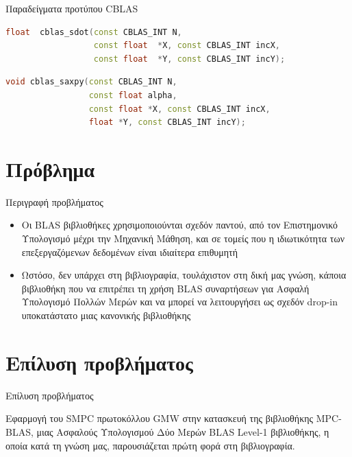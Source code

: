 \documentclass[10pt]{beamer}
\begin{document}
    \begin{frame}[fragile]{Παραδείγματα προτύπου CBLAS}

        \begin{block}{}
            \begin{lstlisting}[firstnumber=1, xleftmargin=10pt, language=C++]
float  cblas_sdot(const CBLAS_INT N,
                  const float  *X, const CBLAS_INT incX,
                  const float  *Y, const CBLAS_INT incY);
            \end{lstlisting}
        \end{block}
        \begin{block}{}
            \begin{lstlisting}[firstnumber=1, xleftmargin=10pt, language=C++]
void cblas_saxpy(const CBLAS_INT N,
                 const float alpha,
                 const float *X, const CBLAS_INT incX,
                 float *Y, const CBLAS_INT incY);
            \end{lstlisting}
        \end{block}

    \end{frame}

    \section{Πρόβλημα}
    \begin{frame}[c]{Περιγραφή προβλήματος}
        \centering
        \begin{block}{}
            \begin{itemize}
                \item Οι BLAS βιβλιοθήκες χρησιμοποιούνται σχεδόν παντού, από τον Επιστημονικό Υπολογισμό μέχρι την Μηχανική Μάθηση, και σε τομείς που η ιδιωτικότητα των επεξεργαζόμενων δεδομένων είναι ιδιαίτερα επιθυμητή
                \item Ωστόσο, δεν υπάρχει στη βιβλιογραφία, τουλάχιστον στη δική μας γνώση, κάποια βιβλιοθήκη που να επιτρέπει τη χρήση BLAS συναρτήσεων για Ασφαλή Υπολογισμό Πολλών Μερών και να μπορεί να λειτουργήσει ως σχεδόν drop-in υποκατάστατο μιας κανονικής βιβλιοθήκης
            \end{itemize}
        \end{block}
    \end{frame}

    \section{Επίλυση προβλήματος}
    \begin{frame}[c]{Επίλυση προβλήματος}
        \centering
        \begin{block}{}
            Εφαρμογή του SMPC πρωτοκόλλου GMW στην κατασκευή της βιβλιοθήκης MPC-BLAS, μιας Ασφαλούς Υπολογισμού Δύο Μερών BLAS Level-1 βιβλιοθήκης, η οποία κατά τη γνώση μας, παρουσιάζεται πρώτη φορά στη βιβλιογραφία.
        \end{block}
    \end{frame}
\end{document}
